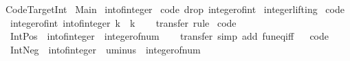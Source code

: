 %
\begin{isabellebody}%
\def\isabellecontext{Code{\isacharunderscore}Target{\isacharunderscore}Int}%
%
\isamarkuptrue%
%
\isadelimtheory
%
\endisadelimtheory
%
\isatagtheory
{}\isamarkupfalse%
\ Code{\isacharunderscore}Target{\isacharunderscore}Int\isanewline
{}\ Main\isanewline
{}%
\endisatagtheory
{\isafoldtheory}%
%
\isadelimtheory
%
\endisadelimtheory
\isanewline
\isanewline
{}\isamarkupfalse%
\ int{\isacharunderscore}of{\isacharunderscore}integer\isanewline
\isanewline
{}\isamarkupfalse%
\ {\isacharbrackleft}{\isacharbrackleft}code\ drop{\isacharcolon}\ integer{\isacharunderscore}of{\isacharunderscore}int{\isacharbrackright}{\isacharbrackright}\isanewline
\isanewline
{}\isamarkupfalse%
\isanewline
{}\ integer{\isachardot}lifting\isanewline
{}\isanewline
\isanewline
{}\isamarkupfalse%
\ {\isacharbrackleft}code{\isacharbrackright}{\isacharcolon}\isanewline
\ \ {\isachardoublequoteopen}integer{\isacharunderscore}of{\isacharunderscore}int\ {\isacharparenleft}int{\isacharunderscore}of{\isacharunderscore}integer\ k{\isacharparenright}\ {\isacharequal}\ k{\isachardoublequoteclose}\isanewline
%
\isadelimproof
\ \ %
\endisadelimproof
%
\isatagproof
{}\isamarkupfalse%
\ transfer\ rule%
\endisatagproof
{\isafoldproof}%
%
\isadelimproof
\isanewline
%
\endisadelimproof
\isanewline
{}\isamarkupfalse%
\ {\isacharbrackleft}code{\isacharbrackright}{\isacharcolon}\isanewline
\ \ {\isachardoublequoteopen}Int{\isachardot}Pos\ {\isacharequal}\ int{\isacharunderscore}of{\isacharunderscore}integer\ {\isasymcirc}\ integer{\isacharunderscore}of{\isacharunderscore}num{\isachardoublequoteclose}\isanewline
%
\isadelimproof
\ \ %
\endisadelimproof
%
\isatagproof
{}\isamarkupfalse%
\ transfer\ {\isacharparenleft}simp\ add{\isacharcolon}\ fun{\isacharunderscore}eq{\isacharunderscore}iff{\isacharparenright}%
\endisatagproof
{\isafoldproof}%
%
\isadelimproof
\ \isanewline
%
\endisadelimproof
\isanewline
{}\isamarkupfalse%
\ {\isacharbrackleft}code{\isacharbrackright}{\isacharcolon}\isanewline
\ \ {\isachardoublequoteopen}Int{\isachardot}Neg\ {\isacharequal}\ int{\isacharunderscore}of{\isacharunderscore}integer\ {\isasymcirc}\ uminus\ {\isasymcirc}\ integer{\isacharunderscore}of{\isacharunderscore}num{\isachardoublequoteclose}\isanewline

\end{isabellebody}

